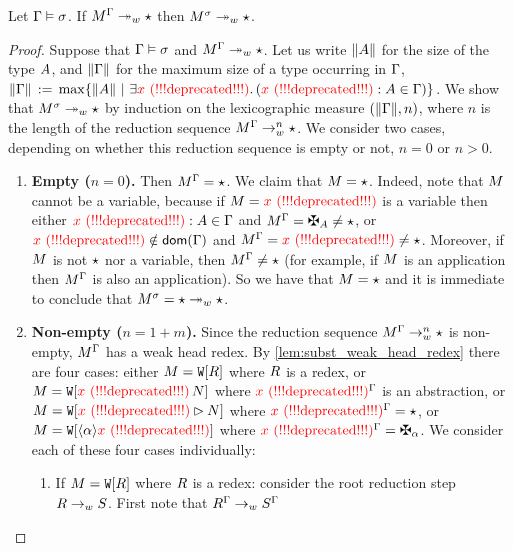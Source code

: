 \begin{lemma}
\label{lem:main_lemma}
Let $\Gamma\vDash\sigma$.
If $M^{\Gamma} \twoheadrightarrow_{w} \star$
then $M^{\sigma} \twoheadrightarrow_{w} \star$.
\end{lemma}
\begin{proof}
Suppose that $\Gamma\vDash\sigma$
and $M^{\Gamma} \twoheadrightarrow_{w} \star$.
Let us write $\lVert A\rVert$ for the size of the type $A$,
and $\lVert\Gamma\rVert$ for the maximum size of a type occurring in $\Gamma$,
\ie $\lVert\Gamma\rVert \,\mathrel{:=}\, \max\{\lVert A\rVert \ |\  \exists \textcolor{red}{x \text{\,\,(!!!deprecated!!!)}}.\, (\textcolor{red}{x \text{\,\,(!!!deprecated!!!)}}:A \in \Gamma)\}$.
We show that $M^{\sigma} \twoheadrightarrow_{w} \star$
by induction on the lexicographic measure $(\lVert\Gamma\rVert, n)$,
where $n$ is the length of the reduction sequence $M^{\Gamma} \to_{w}^n \star$.
We consider two cases, depending on whether this reduction sequence is empty or
not, \ie $n = 0$ or $n > 0$.
\begin{enumerate}
\item
  \textbf{Empty ($n = 0$).}
  Then $M^{\Gamma} = \star$.
  We claim that $M = \star$.
  Indeed, note that $M$ cannot be a variable, because if
  $M = \textcolor{red}{x \text{\,\,(!!!deprecated!!!)}}$ is a variable
  then either $\textcolor{red}{x \text{\,\,(!!!deprecated!!!)}}:A \in \Gamma$
  and $\subs{\utm}{\tenv} = \gen{\typ} \neq \iunit$,
  or $\textcolor{red}{x \text{\,\,(!!!deprecated!!!)}} \notin \mathsf{dom}(\Gamma)$ and $M^{\Gamma} = \textcolor{red}{x \text{\,\,(!!!deprecated!!!)}} \neq \star$.
  Moreover, if $M$ is not $\star$ nor a variable, then
  $M^{\Gamma} \neq \star$
  (for example, if $M$ is an application then
  $M^{\Gamma}$ is also an application).
  So we have that $M = \star$ and it is immediate to conclude that
  $M^{\sigma} = \star \twoheadrightarrow_{w} \star$.
\item
  \textbf{Non-empty ($n = 1 + m$).}
  Since the reduction sequence $M^{\Gamma} \to_{w}^n \star$ is non-empty,
  $M^{\Gamma}$ has a weak head redex.
  By \cref{lem:subst_weak_head_redex} there are four cases:
  either $M = \mathtt{W}[R]$ where $R$ is a redex,
  or $M = \mathtt{W}[\textcolor{red}{x \text{\,\,(!!!deprecated!!!)}}\,N]$ where $\textcolor{red}{x \text{\,\,(!!!deprecated!!!)}}^{\Gamma}$ is an abstraction,
  or $M = \mathtt{W}[\textcolor{red}{x \text{\,\,(!!!deprecated!!!)}}\rhd N]$ where $\textcolor{red}{x \text{\,\,(!!!deprecated!!!)}}^{\Gamma} = \star$,
  or $M = \mathtt{W}[\langle\alpha\rangle\textcolor{red}{x \text{\,\,(!!!deprecated!!!)}}]$ where $\subs{\var}{\tenv} = \genbtyp$.
  We consider each of these four cases individually:
  \begin{enumerate}
  \item
    If $M = \mathtt{W}[R]$ where $R$ is a redex:
    consider the root reduction step $R \to_{w} S$.
    First note that $R^{\Gamma} \to_{w} S^{\Gamma}$

\end{enumerate}
\end{enumerate}
\end{proof}
